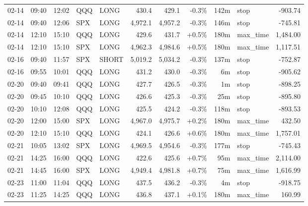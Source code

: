 \documentclass[11pt,a4paper,twoside]{article}
\begin{document}
\begin{center}
\begin{longtable}{>{\color{txtmain}}l l l l l r r r r >{\color{txtmain}}l r}
02-14 & 09:40 & 12:02 & QQQ & LONG & 430.4 & 429.1 & \textcolor{lossred}{-0.3\%} & 142m & stop & \textcolor{lossred}{-903.74} \\
02-14 & 09:40 & 12:06 & SPX & LONG & 4,972.1 & 4,957.2 & \textcolor{lossred}{-0.3\%} & 146m & stop & \textcolor{lossred}{-745.81} \\
02-14 & 12:10 & 15:10 & QQQ & LONG & 429.6 & 431.7 & \textcolor{wingreen}{+0.5\%} & 180m & max\_time & \textcolor{wingreen}{1,484.00} \\
02-14 & 12:10 & 15:10 & SPX & LONG & 4,962.3 & 4,984.6 & \textcolor{wingreen}{+0.5\%} & 180m & max\_time & \textcolor{wingreen}{1,117.51} \\
02-16 & 09:40 & 11:57 & SPX & SHORT & 5,019.2 & 5,034.2 & \textcolor{lossred}{-0.3\%} & 137m & stop & \textcolor{lossred}{-752.87} \\
02-16 & 09:55 & 10:01 & QQQ & LONG & 431.2 & 430.0 & \textcolor{lossred}{-0.3\%} & 6m & stop & \textcolor{lossred}{-905.62} \\
02-20 & 09:40 & 09:41 & QQQ & LONG & 427.7 & 426.5 & \textcolor{lossred}{-0.3\%} & 1m & stop & \textcolor{lossred}{-898.25} \\
02-20 & 09:45 & 10:10 & QQQ & LONG & 426.6 & 425.3 & \textcolor{lossred}{-0.3\%} & 25m & stop & \textcolor{lossred}{-895.80} \\
02-20 & 10:10 & 12:08 & QQQ & LONG & 425.5 & 424.2 & \textcolor{lossred}{-0.3\%} & 118m & stop & \textcolor{lossred}{-893.53} \\
02-20 & 12:00 & 15:00 & SPX & LONG & 4,967.0 & 4,975.7 & \textcolor{wingreen}{+0.2\%} & 180m & max\_time & \textcolor{wingreen}{432.50} \\
02-20 & 12:10 & 15:10 & QQQ & LONG & 424.1 & 426.6 & \textcolor{wingreen}{+0.6\%} & 180m & max\_time & \textcolor{wingreen}{1,757.01} \\
02-21 & 10:05 & 13:02 & SPX & LONG & 4,969.5 & 4,954.6 & \textcolor{lossred}{-0.3\%} & 177m & stop & \textcolor{lossred}{-745.43} \\
02-21 & 14:25 & 16:00 & QQQ & LONG & 422.6 & 425.6 & \textcolor{wingreen}{+0.7\%} & 95m & max\_time & \textcolor{wingreen}{2,114.00} \\
02-21 & 14:45 & 16:00 & SPX & LONG & 4,949.4 & 4,981.8 & \textcolor{wingreen}{+0.7\%} & 75m & max\_time & \textcolor{wingreen}{1,616.99} \\
02-23 & 11:00 & 11:04 & QQQ & LONG & 437.5 & 436.2 & \textcolor{lossred}{-0.3\%} & 4m & stop & \textcolor{lossred}{-918.75} \\
02-23 & 11:25 & 14:25 & QQQ & LONG & 436.8 & 437.1 & \textcolor{wingreen}{+0.1\%} & 180m & max\_time & \textcolor{wingreen}{160.99} \\

\end{longtable}
\end{center}
\end{document}
